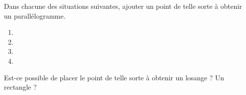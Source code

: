 
\begin{exercice}\label{exo2smath-0169}


    Dans chacune des situations suivantes, ajouter un point de telle sorte à obtenir un parallélogramme.
    \begin{multicols}{2}
    \begin{enumerate}
        \item
   
        \item

\item
   
\item
   
    \end{enumerate}
    \end{multicols}

    Est-ce possible de placer le point de telle sorte à obtenir un losange ? Un rectangle ?

\end{exercice}
